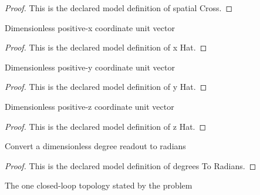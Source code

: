 \begin{proof}
  This is the declared model definition of spatial Cross.
\end{proof}
\begin{definition}[x Hat]
  \label{def:physics:phyx-mini-0947:phyxminiproblems-problemphyxmini0947-xhat}
  Dimensionless positive-x coordinate unit vector
\end{definition}
\begin{proof}
  This is the declared model definition of x Hat.
\end{proof}
\begin{definition}[y Hat]
  \label{def:physics:phyx-mini-0947:phyxminiproblems-problemphyxmini0947-yhat}
  Dimensionless positive-y coordinate unit vector
\end{definition}
\begin{proof}
  This is the declared model definition of y Hat.
\end{proof}
\begin{definition}[z Hat]
  \label{def:physics:phyx-mini-0947:phyxminiproblems-problemphyxmini0947-zhat}
  Dimensionless positive-z coordinate unit vector
\end{definition}
\begin{proof}
  This is the declared model definition of z Hat.
\end{proof}
\begin{definition}
  \label{def:physics:phyx-mini-0947:phyxminiproblems-problemphyxmini0947-degreestoradians}
  Convert a dimensionless degree readout to radians
\end{definition}
\begin{proof}
  This is the declared model definition of degrees To Radians.
\end{proof}
\begin{definition}
  \label{def:physics:phyx-mini-0947:phyxminiproblems-problemphyxmini0947-looptopology}
  The one closed-loop topology stated by the problem
\end{definition}
